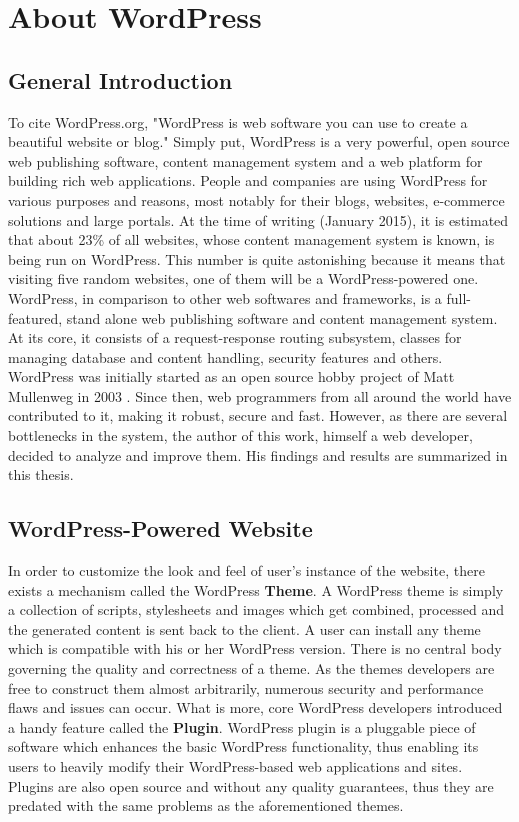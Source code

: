 \section{About WordPress}

\subsection{General Introduction}

To cite WordPress.org, "WordPress is web software you can use to create a beautiful website or blog."\cite{WP:main_site} Simply put, WordPress is a very powerful, open source web publishing software, content management system and a web platform for building rich web applications. People and companies are using WordPress for various purposes and reasons, most notably for their blogs, websites, e-commerce solutions and large portals. At the time of writing (January 2015), it is estimated that about 23\% \cite{WP_usage} of all websites, whose content management system is known, is being run on WordPress. This number is quite astonishing because it means that visiting five random websites, one of them will be a WordPress-powered one. \\

WordPress, in comparison to other web softwares and frameworks, is a full-featured, stand alone web publishing software and content management system. At its core, it consists of a request-response routing subsystem, classes for managing database and content handling, security features and others. WordPress was initially started as an open source hobby project of Matt Mullenweg in 2003 \cite{WP:history}. Since then, web programmers from all around the world have contributed to it, making it robust, secure and fast. However, as there are several bottlenecks in the system, the author of this work, himself a web developer, decided to analyze and improve them. His findings and results are summarized in this thesis.

\subsection{WordPress-Powered Website}

In order to customize the look and feel of user’s instance of the website, there exists a mechanism called the WordPress \textbf{Theme}. A WordPress theme is simply a collection of scripts, stylesheets and images which get combined, processed and the generated content is sent back to the client. A user can install any theme which is compatible with his or her WordPress version. There is no central body governing the quality and correctness of a theme. As the themes developers are free to construct them almost arbitrarily, numerous security and performance flaws and issues can occur. What is more, core WordPress developers introduced a handy feature called the \textbf{Plugin}. WordPress plugin is a pluggable piece of software which enhances the basic WordPress functionality, thus enabling its users to heavily modify their WordPress-based web applications and sites. Plugins are also open source and without any quality guarantees, thus they are predated with the same problems as the aforementioned themes. \\


